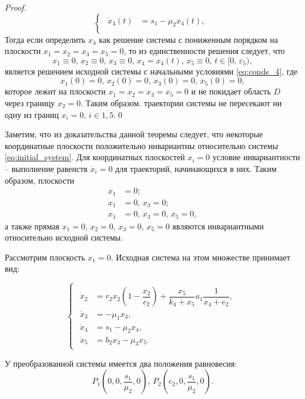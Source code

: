 \documentclass[14pt,a4paper]{extarticle}
\begin{document}
\begin{proof}
\begin{equation*}
\begin{cases}
				\begin{aligned}
					\dot{x}_4(t) &= s_1-\mu_2x_4(t),\\
				\end{aligned}
			\end{cases}
		\end{equation*} 
		Тогда если определить $x_4$ как решение системы с пониженным порядком на плоскости $x_1=x_2=x_3=x_5=0$, то из единственности решения следует, что
		\[x_1\equiv0,\, x_2\equiv0,\, x_3\equiv0,\, x_4=x_4(t),\, x_5\equiv0,\, t\in[0,\,\varepsilon_5),\]
		является решением исходной системы с начальными условиями \ref{eq:conds_4}, где
		\[x_1(0)=0,\, x_2(0)=0,\, x_3(0)=0,\, x_5(0)=0,\]
		которое лежит на плоскости $x_1=x_2=x_3=x_5=0$ и не покидает область $D$ через границу $x_2=0$. Таким образом. траектории системы не пересекают ни одну из границ $x_i=0,\, i\in\overline{1,5}$.\qed
	\end{proof}
	
	Заметим, что из доказательства данной теоремы следует, что некоторые координатные плоскости положительно инвариантны относительно системы \ref{eq:initial_system}. Для координатных плоскостей $x_i=0$ условие инвариантности -- выполнение равенств $\dot{x}_i=0$ для траекторий, начинающихся в них. Таким образом, плоскости  
	\begin{align*}
		x_1&=0;\\
		x_1&=0,\, x_3=0;\\
		x_1&=0,\, x_3=0,\, x_5=0,
	\end{align*}
	а также прямая $x_1=0,\, x_2=0,\, x_3=0,\, x_5=0$ являются инвариантными относительно исходной системы.  
	
	Рассмотрим плоскость $x_1=0$. Исходная система на этом множестве принимает вид:
	
	\begin{equation*}
		\begin{cases}
			\begin{aligned}
				\dot{x}_2 &= r_2x_2\left(1-\dfrac{x_2}{c_2}\right)+\dfrac{x_5}{k_4+x_5}a_1\dfrac{1}{x_4+e_2},\\
				\dot{x}_3 &= -\mu_1x_3,\\
				\dot{x}_4 &= s_1 - \mu_2x_4,\\
				\dot{x}_5 &= b_2x_3-\mu_3x_5.
			\end{aligned}
		\end{cases}
	\end{equation*}
	
	У преобразованной системы имеется два положения равновесия:
	\[P_1\left(0,0,\frac{s_1}{\mu_2},0\right),\, P_2\left(c_2,0,\frac{s_1}{\mu_2},0\right).\]
	
\end{document}
